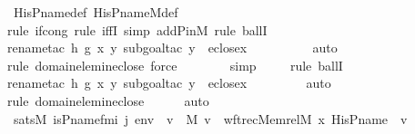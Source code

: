 \begin{isabellebody}
\ His{\isacharunderscore}{\kern0pt}P{\isacharunderscore}{\kern0pt}name{\isacharunderscore}{\kern0pt}def\ His{\isacharunderscore}{\kern0pt}P{\isacharunderscore}{\kern0pt}name{\isacharunderscore}{\kern0pt}M{\isacharunderscore}{\kern0pt}def\ \isanewline
\ \ \ \ \isamarkupfalse%
{\isacharparenleft}{\kern0pt}rule\ if{\isacharunderscore}{\kern0pt}cong{\isacharcomma}{\kern0pt}\ rule\ iffI{\isacharcomma}{\kern0pt}\ simp\ add{\isacharcolon}{\kern0pt}P{\isacharunderscore}{\kern0pt}in{\isacharunderscore}{\kern0pt}M{\isacharcomma}{\kern0pt}\ rule\ ballI{\isacharparenright}{\kern0pt}\isanewline
\ \ \ \ \ \ \ \isamarkupfalse%
{\isacharparenleft}{\kern0pt}rename{\isacharunderscore}{\kern0pt}tac\ h\ g\ x\ y{\isacharcomma}{\kern0pt}\ subgoal{\isacharunderscore}{\kern0pt}tac\ {\isachardoublequoteopen}y\ {\isasymin}\ eclose{\isacharparenleft}{\kern0pt}x{\isacharparenright}{\kern0pt}{\isachardoublequoteclose}{\isacharparenright}{\kern0pt}\isanewline
\ \ \ \ \ \ \ \ \isamarkupfalse%
\ auto{\isacharbrackleft}{\kern0pt}{}{\isacharbrackright}{\kern0pt}\isanewline
\ \ \ \ \ \ \ \isamarkupfalse%
{\isacharparenleft}{\kern0pt}rule\ domain{\isacharunderscore}{\kern0pt}elem{\isacharunderscore}{\kern0pt}in{\isacharunderscore}{\kern0pt}eclose{\isacharcomma}{\kern0pt}\ force{\isacharparenright}{\kern0pt}\isanewline
\ \ \ \ \ \ \isamarkupfalse%
\ simp\isanewline
\ \ \ \ \isamarkupfalse%
{\isacharparenleft}{\kern0pt}rule\ ballI{\isacharparenright}{\kern0pt}\isanewline
\ \ \ \ \ \ \isamarkupfalse%
{\isacharparenleft}{\kern0pt}rename{\isacharunderscore}{\kern0pt}tac\ h\ g\ x\ y{\isacharcomma}{\kern0pt}\ subgoal{\isacharunderscore}{\kern0pt}tac\ {\isachardoublequoteopen}y\ {\isasymin}\ eclose{\isacharparenleft}{\kern0pt}x{\isacharparenright}{\kern0pt}{\isachardoublequoteclose}{\isacharparenright}{\kern0pt}\isanewline
\ \ \ \ \ \ \ \isamarkupfalse%
\ auto{\isacharbrackleft}{\kern0pt}{}{\isacharbrackright}{\kern0pt}\isanewline
\ \ \ \ \ \ \isamarkupfalse%
{\isacharparenleft}{\kern0pt}rule\ domain{\isacharunderscore}{\kern0pt}elem{\isacharunderscore}{\kern0pt}in{\isacharunderscore}{\kern0pt}eclose{\isacharparenright}{\kern0pt}\isanewline
\ \ \ \ \isamarkupfalse%
\ auto\isanewline
\ \ \ \ \isanewline
\ \ \isamarkupfalse%
\ {\isachardoublequoteopen}sats{\isacharparenleft}{\kern0pt}M{\isacharcomma}{\kern0pt}\ is{\isacharunderscore}{\kern0pt}P{\isacharunderscore}{\kern0pt}name{\isacharunderscore}{\kern0pt}fm{\isacharparenleft}{\kern0pt}i{\isacharcomma}{\kern0pt}\ j{\isacharparenright}{\kern0pt}{\isacharcomma}{\kern0pt}\ env{\isacharparenright}{\kern0pt}\ {\isasymlongleftrightarrow}\ {\isacharparenleft}{\kern0pt}{\isasymexists}v\ {\isasymin}\ M{\isachardot}{\kern0pt}\ v\ {\isacharequal}{\kern0pt}\ wftrec{\isacharparenleft}{\kern0pt}Memrel{\isacharparenleft}{\kern0pt}M{\isacharparenright}{\kern0pt}{\isacharcircum}{\kern0pt}{\isacharplus}{\kern0pt}{\isacharcomma}{\kern0pt}\ x{\isacharcomma}{\kern0pt}\ His{\isacharunderscore}{\kern0pt}P{\isacharunderscore}{\kern0pt}name{\isacharparenright}{\kern0pt}\ {\isasymand}\ v\ {\isacharequal}{\kern0pt}\ {}{\isacharparenright}{\kern0pt}{\isachardoublequoteclose}\ \isanewline

\end{isabellebody}

